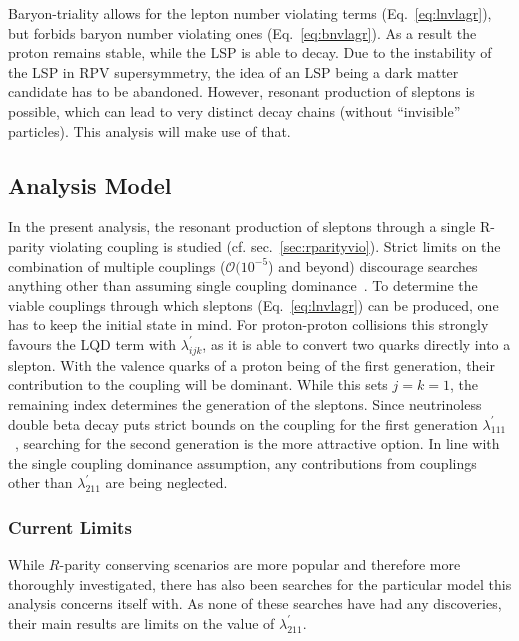 Baryon-triality allows for the lepton number violating terms (Eq.~\ref{eq:lnvlagr}), but forbids baryon number violating ones (Eq.~\ref{eq:bnvlagr}). As a result the proton remains stable, while the LSP is able to decay. Due to the instability of the LSP in RPV supersymmetry, the idea of an LSP being a dark matter candidate has to be abandoned. However, resonant production of sleptons is possible, which can lead to very distinct decay chains (without ``invisible'' particles). This analysis will make use of that.


\subsection{Analysis Model}
\label{sec:anamodel}

In the present analysis, the resonant production of sleptons through a single R-parity violating coupling is studied (cf. sec.~\ref{sec:rparityvio}). Strict limits on the combination of multiple couplings ($\mathcal{O}(10^{-5}$) and beyond) discourage searches anything other than assuming single coupling dominance~\cite{rpvimpl}. To determine the viable couplings through which sleptons (Eq.~\ref{eq:lnvlagr}) can be produced, one has to keep the initial state in mind. For proton-proton collisions this strongly favours the LQD term with $\lambda^\prime_{ijk}$, as it is able to convert two quarks directly into a slepton. With the valence quarks of a proton being of the first generation, their contribution to the coupling will be dominant. While this sets $j = k = 1$, the remaining index determines the generation of the sleptons. Since neutrinoless double beta decay puts strict bounds on the coupling for the first generation $\lambda^\prime_{111}$~\cite{rpvimpl}, searching for the second generation is the more attractive option. In line with the single coupling dominance assumption, any contributions from couplings other than $\lambda^\prime_{211}$ are being neglected.

\subsubsection{Current Limits}

While $R$-parity conserving scenarios are more popular and therefore more thoroughly investigated, there has also been searches for the particular model this analysis concerns itself with. As none of these searches have had any discoveries, their main results are limits on the value of $\lambda^\prime_{211}$.

